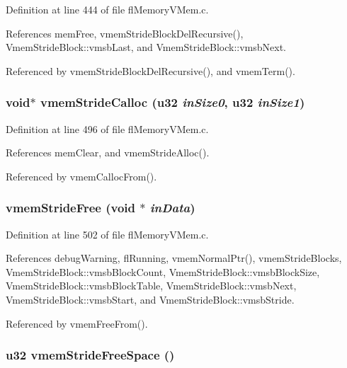 Definition at line 444 of file fl\-Memory\-VMem.c.

References mem\-Free, vmem\-Stride\-Block\-Del\-Recursive(), Vmem\-Stride\-Block::vmsb\-Last, and Vmem\-Stride\-Block::vmsb\-Next.

Referenced by vmem\-Stride\-Block\-Del\-Recursive(), and vmem\-Term().
\subsubsection{\setlength{\rightskip}{0pt plus 5cm}void$\ast$ vmem\-Stride\-Calloc (u32 {\em in\-Size0}, u32 {\em in\-Size1})}\label{flMemoryVMem_8h_29bad506a933463bcced39a356cd71eb}




Definition at line 496 of file fl\-Memory\-VMem.c.

References mem\-Clear, and vmem\-Stride\-Alloc().

Referenced by vmem\-Calloc\-From().
\subsubsection{ vmem\-Stride\-Free (void $\ast$ {\em in\-Data})}\label{flMemoryVMem_8h_a986e759682fc3a182f333d0e3f0f8b6}




Definition at line 502 of file fl\-Memory\-VMem.c.

References debug\-Warning, fl\-Running, vmem\-Normal\-Ptr(), vmem\-Stride\-Blocks, Vmem\-Stride\-Block::vmsb\-Block\-Count, Vmem\-Stride\-Block::vmsb\-Block\-Size, Vmem\-Stride\-Block::vmsb\-Block\-Table, Vmem\-Stride\-Block::vmsb\-Next, Vmem\-Stride\-Block::vmsb\-Start, and Vmem\-Stride\-Block::vmsb\-Stride.

Referenced by vmem\-Free\-From().
\subsubsection{\setlength{\rightskip}{0pt plus 5cm}u32 vmem\-Stride\-Free\-Space ()}\label{flMemoryVMem_8h_9d368ada737fd80bb8abed2825c326ff}




